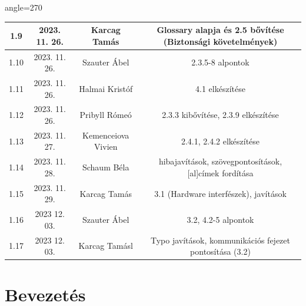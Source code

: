 \documentclass{scrreprt}
\begin{document}
\begin{center}
\begin{adjustbox}{angle=270}
\begin{tabular}{|c|c|c|c|}
                  \hline
                  1.9    & 2023. 11. 26. & Karcag Tamás       & Glossary alapja és 2.5 bővítése (Biztonsági követelmények) \\
                  \hline
                  1.10   & 2023. 11. 26. & Szauter Ábel       & 2.3.5-8 alpontok                                           \\
                  \hline
                  1.11   & 2023. 11. 26. & Halmai Kristóf     & 4.1 elkészítése                                            \\
                  \hline
                  1.12   & 2023. 11. 26. & Pribyll Rómeó      & 2.3.3 kibővítése, 2.3.9 elkészítése                        \\
                  \hline
                  1.13   & 2023. 11. 27. & Kemenceiova Vivien & 2.4.1, 2.4.2 elkészítése                                   \\
                  \hline
                  1.14   & 2023. 11. 28. & Schaum Béla        & hibajavítások, szövegpontosítások, [al]címek fordítása     \\
                  \hline
                  1.15   & 2023. 11. 29. & Karcag Tamás       & 3.1 (Hardware interfészek), javítások                      \\
                  \hline
                  1.16   & 2023 12. 03.  & Szauter Ábel       & 3.2, 4.2-5 alpontok                                        \\
                  \hline
                  1.17   & 2023 12. 03.  & Karcag Tamásl      & Typo javítások, kommunikációs fejezet pontosítása (3.2)    \\
                  \hline
            \end{tabular}
      \end{adjustbox}
\end{center}

\chapter{Bevezetés}
\end{document}
